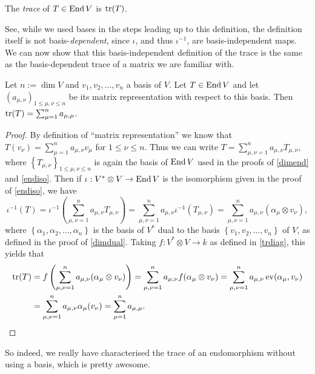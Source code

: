 \begin{dfn}
  The \textit{trace} of $T \in \operatorname{End} V$ is $\operatorname{tr}(T)$.
\end{dfn}

\begin{rem}
  See, while we used bases in the steps leading up to this definition, the definition itself is not basis-\emph{dependent}, since $\iota$, and thus $\iota^{-1}$, are basis-independent maps. We can now show that this basis-independent definition of the trace is the same as the basis-dependent trace of a matrix we are familiar with.
\end{rem}

\begin{pro}
  Let $n := \dim V$ and $v_1,v_2,\ldots,v_n$ a basis of $V$. Let $T \in \operatorname{End} V$ and let $(a_{\mu,\nu})_{1 \le \mu,\nu \le n}$ be its matrix representation with respect to this basis. Then $\operatorname{tr}(T) = \sum_{\mu=1}^n a_{\mu,\mu}$.
  \begin{proof}
    By definition of ``matrix representation'' we know that $T(v_{\nu}) = \sum_{\mu=1}^n a_{\mu,\nu} v_\mu$ for $1 \le \nu \le n$. Thus we can write $T = \sum_{\mu,\nu=1}^n a_{\mu,\nu}T_{\mu,\nu}$, where $\left\{T_{\mu,\nu}\right\}_{1 \le \mu,\nu \le n}$ is again the basis of $\operatorname{End} V$ used in the proofs of \ref{dimend} and \ref{endiso}. Then if $\iota : V^* \otimes V \to \operatorname{End} V$ is the isomorphism given in the proof of \ref{endiso}, we have
\[ \iota^{-1}(T) = \iota^{-1}\left(\sum_{\mu,\nu=1}^n a_{\mu,\nu}T_{\mu,\nu}\right) = \sum_{\mu,\nu=1}^n a_{\mu,\nu} \iota^{-1}(T_{\mu,\nu}) = \sum_{\mu,\nu=1}^n a_{\mu,\nu}(\alpha_{\mu} \otimes v_\nu), \]
where $\left\{\alpha_1,\alpha_2,\ldots,\alpha_n\right\}$ is the basis of $V^*$ dual to the basis $\left\{v_1,v_2,\ldots,v_n\right\}$ of $V$, as defined in the proof of \ref{dimdual}. Taking $f : V^* \otimes V \to k$ as defined in \ref{trdiag}, this yields that
\begin{align*}
  \operatorname{tr}(T) &= f\left(\sum_{\mu,\nu=1}^n a_{\mu,\nu}(\alpha_{\mu} \otimes v_\nu)\right) = \sum_{\mu,\nu=1}^n a_{\mu,\nu}f(\alpha_{\mu} \otimes v_\nu) = \sum_{\mu,\nu=1}^n a_{\mu,\nu} \operatorname{ev}(\alpha_\mu, v_\nu) \\ &= \sum_{\mu,\nu=1}^n a_{\mu,\nu}\alpha_{\mu}(v_\nu) = \sum_{\mu=1}^n a_{\mu,\mu}. \qedhere
\end{align*}
   \end{proof}
\end{pro}

So indeed, we really have characterised the trace of an endomorphism without using a basis, which is pretty awesome. 

